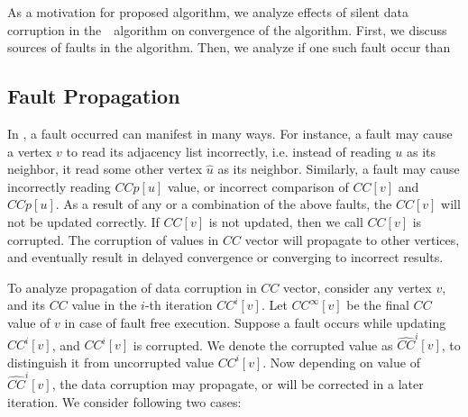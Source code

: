 

As a motivation for proposed algorithm, we analyze effects of silent data corruption in the~\sv~algorithm on convergence of the algorithm.
First, we discuss sources of faults in the \sv algorithm. Then, we analyze if one such fault occur than

\subsection{Fault Propagation}
In , a fault occurred can manifest in many ways. For instance, a fault may cause a vertex $v$ to read its adjacency
list incorrectly, i.e. instead of reading $u$ as its neighbor, it read some other vertex $\hat{u}$ as its neighbor. 
Similarly, a fault may cause incorrectly reading $CCp[u]$ value, or incorrect comparison of $CC[v]$ and $CCp[u]$. 
As a result of any or a combination of the above faults, the $CC[v]$ will not be updated correctly. 
If $CC[v]$ is not updated, then we call $CC[v]$ is corrupted. 
%
%
The corruption of values in $CC$ vector will propagate to other vertices, and eventually
result in delayed convergence or converging to incorrect results.



To analyze propagation of data corruption in $CC$ vector, consider any vertex $v$, and its $CC$ value in the $i$-th 
iteration $CC^{i}[v]$. Let $CC^{\infty}[v]$ be the final $CC$ value of $v$ in case of fault free execution. 
Suppose a fault occurs while updating $CC^{i}[v]$, and  $CC^{i}[v]$ is corrupted. 
We denote the corrupted value as $\hat{CC}^{i}[v]$, to distinguish it from uncorrupted value $CC^{i}[v]$.
Now depending on value of $\hat{CC}^{i}[v]$, the data corruption may propagate, or will be corrected in a later iteration. We consider following two cases:

